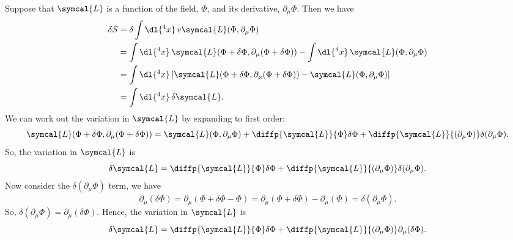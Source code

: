 \documentclass[fleqn]{NotesClass}
\newcommand{\lagrangianDensity}{\symcal{L}}
\begin{document}
    Suppose that \(\lagrangianDensity\) is a function of the field, \(\Phi\), and its derivative, \(\partial_\mu \Phi\).
    Then we have
    \begin{align}
        \delta S &= \delta \int \dl{^4x} \,v\lagrangianDensity(\Phi, \partial_\mu \Phi)\\
        &= \int \dl{^4x} \, \lagrangianDensity(\Phi + \delta\Phi, \partial_\mu(\Phi + \delta \Phi)) - \int \dl{^4x} \, \lagrangianDensity(\Phi, \partial_\mu \Phi)\\
        &= \int \dl{^4x} \, [\lagrangianDensity(\Phi + \delta\Phi, \partial_\mu(\Phi + \delta\Phi)) - \lagrangianDensity(\Phi, \partial_\mu \Phi)]\\
        &= \int \dl{^4x} \, \delta\lagrangianDensity.
    \end{align}
    We can work out the variation in \(\lagrangianDensity\) by expanding to first order:
    \begin{equation}
        \lagrangianDensity(\Phi + \delta \Phi, \partial_\mu (\Phi + \delta \Phi)) = \lagrangianDensity(\Phi, \partial_\mu \Phi) + \diffp{\lagrangianDensity}{\Phi} \delta \Phi + \diffp{\lagrangianDensity}{(\partial_\mu \Phi)} \delta(\partial_\mu \Phi).
    \end{equation}
    So, the variation in \(\lagrangianDensity\) is
    \begin{equation}
        \delta\lagrangianDensity = \diffp{\lagrangianDensity}{\Phi} \delta \Phi + \diffp{\lagrangianDensity}{(\partial_\mu \Phi)} \delta(\partial_\mu \Phi).
    \end{equation}
    Now consider the \(\delta(\partial_\mu \Phi)\) term, we have \begin{equation}
        \partial_\mu(\delta \Phi) = \partial_\mu(\Phi + \delta \Phi - \Phi) = \partial_\mu (\Phi + \delta \Phi) - \partial_\mu(\Phi) = \delta(\partial_\mu \Phi).
    \end{equation}
    So, \(\delta(\partial_\mu \Phi) = \partial_\mu(\delta \Phi)\).
    Hence, the variation in \(\lagrangianDensity\) is
    \begin{equation}
        \delta\lagrangianDensity = \diffp{\lagrangianDensity}{\Phi} \delta \Phi + \diffp{\lagrangianDensity}{(\partial_\mu \Phi)} \partial_\mu(\delta\Phi).
    \end{equation}
    
\end{document}
